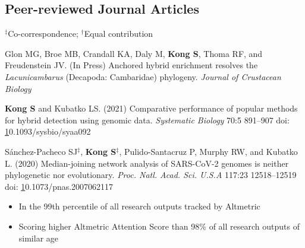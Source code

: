 \documentclass[11pt]{article}
\begin{document}
\subsection*{Peer-reviewed Journal Articles}
$^\ddag$Co-correspondence; $^\dag$Equal contribution
\begin{etaremune}

\item Glon MG, Broe MB, Crandall KA, Daly M, \textbf{Kong S}, Thoma RF, and Freudenstein JV. (In Press) Anchored hybrid enrichment resolves the \textit{Lacunicambarus} (Decapoda: Cambaridae) phylogeny. \textit{Journal of Crustacean Biology}

\item \textbf{Kong S} and Kubatko LS. (2021) Comparative performance of popular methods for hybrid detection using genomic data. \textit {Systematic Biology} 70:5 891–907 doi: \href{10.1093/sysbio/syaa092}10.1093/sysbio/syaa092

\item  Sánchez-Pacheco SJ{$^\ddag$}, \textbf{Kong S}{$^\ddag$}, Pulido-Santacruz P, Murphy RW, and Kubatko L. (2020) Median-joining network analysis of SARS-CoV-2 genomes is neither phylogenetic nor evolutionary. \textit{Proc. Natl. Acad. Sci. U.S.A} 117:23 12518–12519 doi: \href{https://doi.org/10.1073/pnas.2007062117}10.1073/pnas.2007062117
	
	\begin{itemize}\item In the 99th percentile of all research outputs tracked by Altmetric
				\item Scoring higher Altmetric Attention Score than 98\% of all research outputs of similar age \end{itemize}
	

\end{etaremune}
\end{document}
